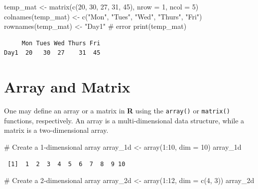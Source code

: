 \documentclass[
  letterpaper,
  DIV=11,
  numbers=noendperiod]{scrreprt}
\newenvironment{Shaded}{\begin{snugshade}}{\end{snugshade}}
\newcommand{\AttributeTok}[1]{\textcolor[rgb]{0.40,0.45,0.13}{#1}}
\newcommand{\CommentTok}[1]{\textcolor[rgb]{0.37,0.37,0.37}{#1}}
\newcommand{\DecValTok}[1]{\textcolor[rgb]{0.68,0.00,0.00}{#1}}
\newcommand{\FunctionTok}[1]{\textcolor[rgb]{0.28,0.35,0.67}{#1}}
\newcommand{\NormalTok}[1]{\textcolor[rgb]{0.00,0.23,0.31}{#1}}
\newcommand{\OtherTok}[1]{\textcolor[rgb]{0.00,0.23,0.31}{#1}}
\newcommand{\SpecialCharTok}[1]{\textcolor[rgb]{0.37,0.37,0.37}{#1}}
\newcommand{\StringTok}[1]{\textcolor[rgb]{0.13,0.47,0.30}{#1}}
\begin{document}
\begin{Shaded}
\begin{Highlighting}[]
\NormalTok{temp\_mat }\OtherTok{\textless{}{-}} \FunctionTok{matrix}\NormalTok{(}\FunctionTok{c}\NormalTok{(}\DecValTok{20}\NormalTok{, }\DecValTok{30}\NormalTok{, }\DecValTok{27}\NormalTok{, }\DecValTok{31}\NormalTok{, }\DecValTok{45}\NormalTok{), }\AttributeTok{nrow =} \DecValTok{1}\NormalTok{, }\AttributeTok{ncol =} \DecValTok{5}\NormalTok{)}
\FunctionTok{colnames}\NormalTok{(temp\_mat) }\OtherTok{\textless{}{-}} \FunctionTok{c}\NormalTok{(}\StringTok{"Mon"}\NormalTok{, }\StringTok{"Tues"}\NormalTok{, }\StringTok{"Wed"}\NormalTok{, }\StringTok{"Thurs"}\NormalTok{, }\StringTok{"Fri"}\NormalTok{)}
\FunctionTok{rownames}\NormalTok{(temp\_mat) }\OtherTok{\textless{}{-}} \StringTok{"Day1"} \CommentTok{\# error}
\FunctionTok{print}\NormalTok{(temp\_mat)}
\end{Highlighting}
\end{Shaded}

\begin{verbatim}
     Mon Tues Wed Thurs Fri
Day1  20   30  27    31  45
\end{verbatim}

\section{Array and Matrix}\label{array-and-matrix}

One may define an array or a matrix in \textbf{R} using the
\texttt{array()} or \texttt{matrix()} functions, respectively. An array
is a multi-dimensional data structure, while a matrix is a
two-dimensional array.

\begin{Shaded}
\begin{Highlighting}[]
\CommentTok{\# Create a 1{-}dimensional array}
\NormalTok{array\_1d }\OtherTok{\textless{}{-}} \FunctionTok{array}\NormalTok{(}\DecValTok{1}\SpecialCharTok{:}\DecValTok{10}\NormalTok{, }\AttributeTok{dim =} \DecValTok{10}\NormalTok{)}
\NormalTok{array\_1d}
\end{Highlighting}
\end{Shaded}

\begin{verbatim}
 [1]  1  2  3  4  5  6  7  8  9 10
\end{verbatim}

\begin{Shaded}
\begin{Highlighting}[]
\CommentTok{\# Create a 2{-}dimensional array}
\NormalTok{array\_2d }\OtherTok{\textless{}{-}} \FunctionTok{array}\NormalTok{(}\DecValTok{1}\SpecialCharTok{:}\DecValTok{12}\NormalTok{, }\AttributeTok{dim =} \FunctionTok{c}\NormalTok{(}\DecValTok{4}\NormalTok{, }\DecValTok{3}\NormalTok{))}
\NormalTok{array\_2d}
\end{Highlighting}
\end{Shaded}
\end{document}
